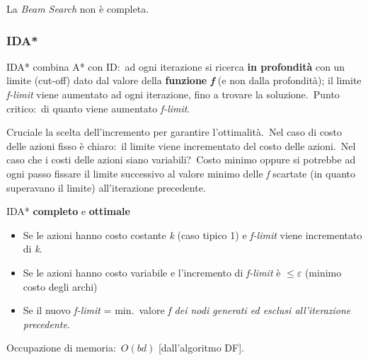 La \textit{Beam Search} non è completa.

\subsubsection{IDA*}
IDA* combina A* con ID:\ ad ogni iterazione si ricerca \textbf{in profondità} con un limite (cut-off) dato dal valore della \textbf{funzione \textit{f}} (e non dalla
profondità); il limite \textit{f-limit} viene aumentato ad ogni iterazione, fino a trovare la soluzione.\
Punto critico:\ di quanto viene aumentato \textit{f-limit}.

Cruciale la scelta dell'incremento per garantire l'ottimalità.\
Nel caso di costo delle azioni fisso è chiaro:\ il limite viene incrementato del costo delle azioni.\
Nel caso che i costi delle azioni siano variabili?\ Costo minimo oppure si potrebbe ad ogni passo fissare il limite successivo al valore minimo delle \textit{f} scartate (in quanto superavano il limite) all'iterazione precedente.

\noindent IDA* \textbf{completo} e \textbf{ottimale}
\begin{itemize}
	\item Se le azioni hanno costo costante \textit{k} (caso tipico 1) e \textit{f-limit} viene incrementato di \textit{k}.
	\item Se le azioni hanno costo variabile e l'incremento di \textit{f-limit} è $\leq \varepsilon$ (minimo costo degli archi)
	\item Se il nuovo \textit{f-limit} = min.\ valore \textit{f dei nodi generati ed esclusi all'iterazione precedente}.
\end{itemize}
Occupazione di memoria:\ $O(bd)$ [dall'algoritmo DF].

